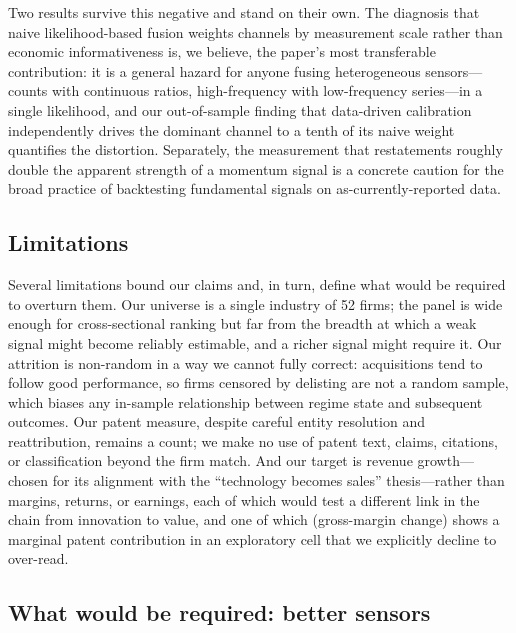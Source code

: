 \documentclass[11pt]{article}
\begin{document}
Two results survive this negative and stand on their own. The diagnosis that naive likelihood-based fusion weights channels by measurement scale rather than economic informativeness is, we believe, the paper's most transferable contribution: it is a general hazard for anyone fusing heterogeneous sensors---counts with continuous ratios, high-frequency with low-frequency series---in a single likelihood, and our out-of-sample finding that data-driven calibration independently drives the dominant channel to a tenth of its naive weight quantifies the distortion. Separately, the measurement that restatements roughly double the apparent strength of a momentum signal is a concrete caution for the broad practice of backtesting fundamental signals on as-currently-reported data.

\subsection{Limitations}

Several limitations bound our claims and, in turn, define what would be required to overturn them. Our universe is a single industry of 52 firms; the panel is wide enough for cross-sectional ranking but far from the breadth at which a weak signal might become reliably estimable, and a richer signal might require it. Our attrition is non-random in a way we cannot fully correct: acquisitions tend to follow good performance, so firms censored by delisting are not a random sample, which biases any in-sample relationship between regime state and subsequent outcomes. Our patent measure, despite careful entity resolution and reattribution, remains a count; we make no use of patent text, claims, citations, or classification beyond the firm match. And our target is revenue growth---chosen for its alignment with the ``technology becomes sales'' thesis---rather than margins, returns, or earnings, each of which would test a different link in the chain from innovation to value, and one of which (gross-margin change) shows a marginal patent contribution in an exploratory cell that we explicitly decline to over-read.

\subsection{What would be required: better sensors}
\end{document}
